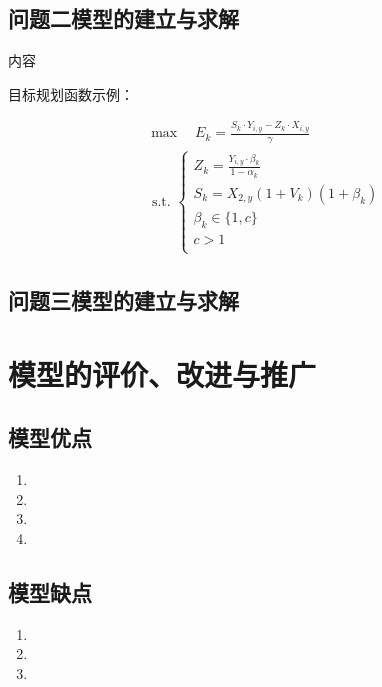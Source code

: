 \documentclass[a4paper]{article}
\begin{document}
	
	\subsection{问题二模型的建立与求解}
	
		内容
		
		目标规划函数示例：
		
		\begin{equation}
			\begin{aligned}
				& \max \quad E_k=\frac{S_k \cdot Y_{i, y}-Z_k \cdot X_{i, y}}{\gamma} \\
				& \text { s.t. }\left\{\begin{array}{l}
					Z_k=\frac{Y_{i, y} \cdot \beta_k}{1-\alpha_k} \\
					S_k=X_{2, y}\left(1+V_k\right)\left(1+\beta_k\right) \\
					\beta_k \in\{1, c\} \\
					c>1 \\
					
				\end{array}\right.
			\end{aligned}
		\end{equation}
	
	\subsection{问题三模型的建立与求解}
	
	
	\section{模型的评价、改进与推广}
	\subsection{模型优点}
	\begin{enumerate}
		\item 
		\item 
		\item 
		\item 
	\end{enumerate}
	
	\subsection{模型缺点}
	\begin{enumerate}
		\item 
		\item 
		\item 
	\end{enumerate}
	
\end{document}
